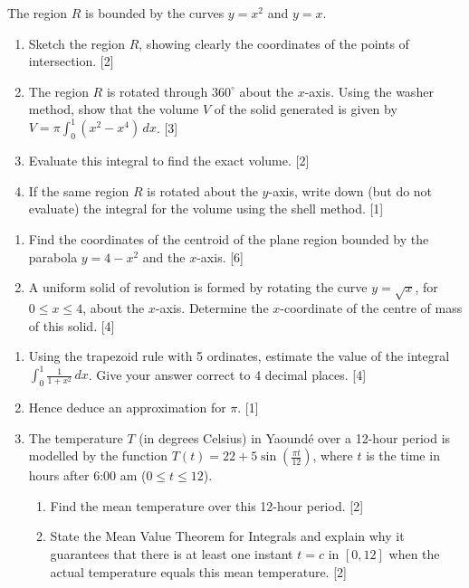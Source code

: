 \documentclass[11pt]{article}
\begin{document}
\begin{exercice}
The region $R$ is bounded by the curves $y = x^2$ and $y = x$.
\begin{enumerate}
\item Sketch the region $R$, showing clearly the coordinates of the points of intersection. [2]
\item The region $R$ is rotated through $360^\circ$ about the $x$-axis. Using the washer method, show that the volume $V$ of the solid generated is given by $V = \pi \int_0^1 (x^2 - x^4)\,dx$. [3]
\item Evaluate this integral to find the exact volume. [2]
\item If the same region $R$ is rotated about the $y$-axis, write down (but do not evaluate) the integral for the volume using the shell method. [1]
\end{enumerate}
\end{exercice}

\begin{exercice}
\begin{enumerate}
\item Find the coordinates of the centroid of the plane region bounded by the parabola $y = 4 - x^2$ and the $x$-axis. [6]
\item A uniform solid of revolution is formed by rotating the curve $y = \sqrt{x}$, for $0 \le x \le 4$, about the $x$-axis. Determine the $x$-coordinate of the centre of mass of this solid. [4]
\end{enumerate}
\end{exercice}

\begin{exercice}
\begin{enumerate}
\item Using the trapezoid rule with 5 ordinates, estimate the value of the integral $\int_0^1 \frac{1}{1+x^2}\,dx$. Give your answer correct to 4 decimal places. [4]
\item Hence deduce an approximation for $\pi$. [1]
\item The temperature $T$ (in degrees Celsius) in Yaoundé over a 12-hour period is modelled by the function $T(t) = 22 + 5\sin\left(\frac{\pi t}{12}\right)$, where $t$ is the time in hours after 6:00 am ($0 \le t \le 12$).
\begin{enumerate}
\item Find the mean temperature over this 12-hour period. [2]
\item State the Mean Value Theorem for Integrals and explain why it guarantees that there is at least one instant $t = c$ in $[0, 12]$ when the actual temperature equals this mean temperature. [2]
\end{enumerate}
\end{enumerate}
\end{exercice}
\end{document}
